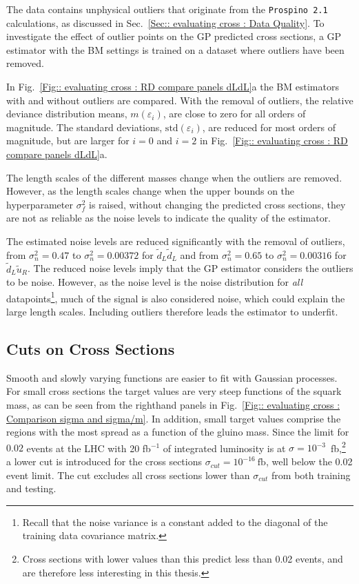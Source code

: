 \documentclass[twoside,english]{uiofysmaster}
\begin{document}
{{The data contains unphysical outliers that originate from the \verb|Prospino 2.1| calculations, as discussed in Sec.~\ref{Sec:: evaluating cross : Data Quality}. To investigate the effect of outlier points on the GP predicted cross sections, a GP estimator with the BM settings is trained on a dataset where outliers have been removed. 

In Fig.~\ref{Fig:: evaluating cross : RD compare panels dLdL}a the BM estimators with and without outliers are compared. With the removal of outliers, the relative deviance distribution means, $m(\varepsilon_i)$, are close to zero for all orders of magnitude. The standard deviations, $\mathrm{std}(\varepsilon_i)$, are reduced for most orders of magnitude, but are larger for $i=0$ and $i=2$ in Fig.~\ref{Fig:: evaluating cross : RD compare panels dLdL}a.

The length scales of the different masses change when the outliers are removed. However, as the length scales change when the upper bounds on the hyperparameter $\sigma_f^2$ is raised, without changing the predicted cross sections, they are not as reliable as the noise levels to indicate the quality of the estimator.
 
The estimated noise levels are reduced significantly with the removal of outliers, from $\sigma_n^2 = 0.47$ to $\sigma_n^2 = 0.00372$ for $\widetilde{d}_L \widetilde{d}_L$ and from $\sigma_n^2 = 0.65$ to $\sigma_n^2= 0.00316$ for $\widetilde{d}_L \widetilde{u}_R$. The reduced noise levels imply that the GP estimator considers the outliers to be noise. However, as the noise level is the noise distribution for \textit{all} datapoints\footnote{Recall that the noise variance is a constant added to the diagonal of the training data covariance matrix.}, much of the signal is also considered noise, which could explain the large length scales. Including outliers therefore leads the estimator to underfit.   


\subsection{Cuts on Cross Sections}

Smooth and slowly varying functions are easier to fit with Gaussian processes. For small cross sections the target values are very steep functions of the squark mass, as can be seen from the righthand panels in Fig.~\ref{Fig:: evaluating cross : Comparison sigma and sigma/m}. In addition, small target values comprise the regions with the most spread as a function of the gluino mass. Since the limit for $0.02$ events at the LHC with 20 fb$^{-1}$ of integrated luminosity is at $\sigma = 10^{-3}$~fb,\footnote{Cross sections with lower values than this predict less than 0.02 events, and are therefore less interesting in this thesis.} a lower cut is introduced for the cross sections $\sigma_{cut} = 10^{-16}~\mathrm{fb}$, well below the 0.02 event limit. The cut excludes all cross sections lower than $\sigma_{cut}$ from both training and testing. 

}}
\end{document}

